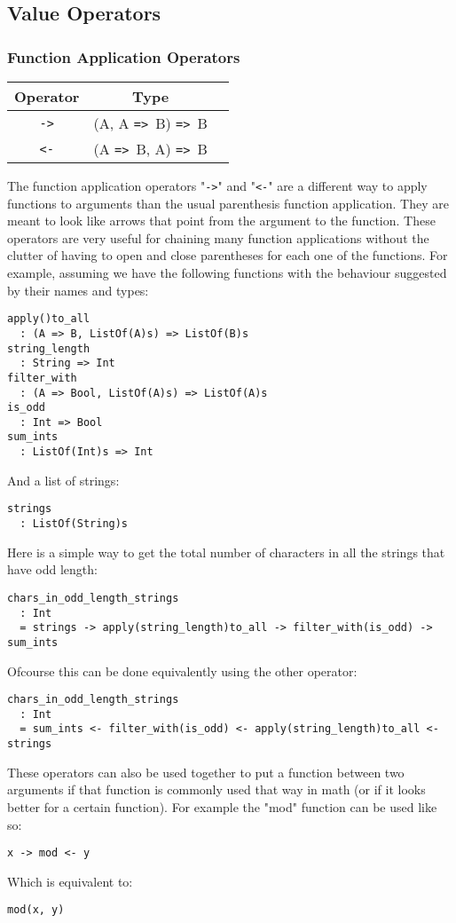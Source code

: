 \documentclass{article}
\def\ra{\texttt{=>}\ }
\begin{document}
\subsection{Value Operators}

\subsubsection{Function Application Operators}

\begin{center}
\begin{tabular}{ |c|c|c| } 
\hline
Operator & Type \\ 
\hline
\hline
\texttt{->} & (A, A \ra B) \ra B \\
\hline
\texttt{<-} & (A \ra B, A) \ra B \\
\hline
\end{tabular}
\end{center}
The function application operators "\texttt{->}" and "\texttt{<-}" are a
different way to apply functions to arguments than the usual parenthesis
function application.  They are meant to look like arrows that point from the
argument to the function.  These operators are very useful for chaining many
function applications without the clutter of having to open and close
parentheses for each one of the functions.  For example, assuming we have the
following functions with the behaviour suggested by their names and types:
\begin{verbatim}
apply()to_all
  : (A => B, ListOf(A)s) => ListOf(B)s
string_length
  : String => Int
filter_with
  : (A => Bool, ListOf(A)s) => ListOf(A)s
is_odd
  : Int => Bool
sum_ints
  : ListOf(Int)s => Int
\end{verbatim}
And a list of strings:
\begin{verbatim}
strings
  : ListOf(String)s
\end{verbatim}
Here is a simple way to get the total number of characters in all the strings
that have odd length:
\begin{verbatim}
chars_in_odd_length_strings
  : Int
  = strings -> apply(string_length)to_all -> filter_with(is_odd) -> sum_ints
\end{verbatim}
Ofcourse this can be done equivalently using the other operator:
\begin{verbatim}
chars_in_odd_length_strings
  : Int
  = sum_ints <- filter_with(is_odd) <- apply(string_length)to_all <- strings

\end{verbatim}
These operators can also be used together to put a function between two arguments
if that function is commonly used that way in math (or if it looks better for a
certain function). For example the "mod" function can be used like so:
\begin{center}
\texttt{x -> mod <- y}
\end{center}
Which is equivalent to:
\begin{center}
\texttt{mod(x, y)}
\end{center}
\end{document}
